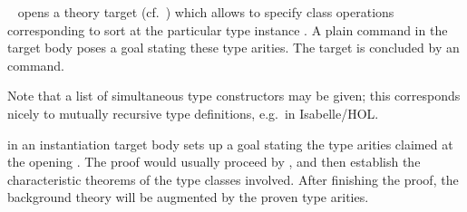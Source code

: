 \begin{isabellebody}
\begin{isamarkuptext}
\begin{description}
  \item \hyperlink{command.instantiation}{\mbox{}}~ opens a theory target (cf.\ ) which
  allows to specify class operations  corresponding
  to sort  at the particular type instance .  A plain \hyperlink{command.instance}{\mbox{}} command in the
  target body poses a goal stating these type arities.  The target is
  concluded by an \hyperlink{command.local.end}{\mbox{}} command.

  Note that a list of simultaneous type constructors may be given;
  this corresponds nicely to mutually recursive type definitions, e.g.\
  in Isabelle/HOL.

  \item \hyperlink{command.instance}{\mbox{}} in an instantiation target body sets
  up a goal stating the type arities claimed at the opening \hyperlink{command.instantiation}{\mbox{}}.  The proof would usually proceed by \hyperlink{method.intro-classes}{\mbox{}}, and then establish the characteristic theorems of
  the type classes involved.  After finishing the proof, the
  background theory will be augmented by the proven type arities.


\end{description}
\end{isamarkuptext}
\end{isabellebody}
